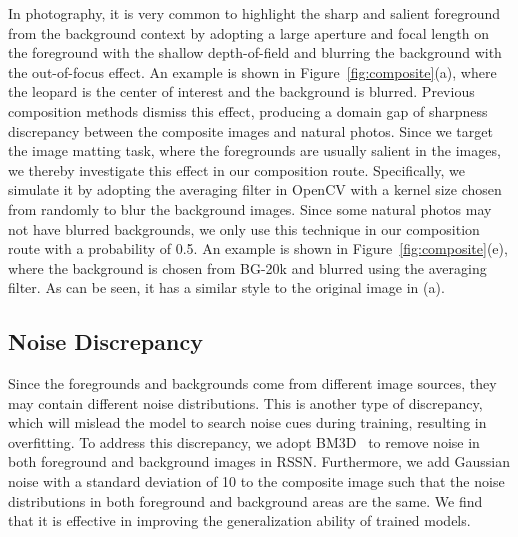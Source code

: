 \documentclass[twocolumn]{svjour3}
\begin{document}
In photography, it is very common to highlight the sharp and salient foreground from the background context by adopting a large aperture and focal length on the foreground with the shallow depth-of-field and blurring the background with the out-of-focus effect. An example is shown in Figure~\ref{fig:composite}(a), where the leopard is the center of interest and the background is blurred. Previous composition methods dismiss this effect, producing a domain gap of sharpness discrepancy between the composite images and natural photos. Since we target the image matting task, where the foregrounds are usually salient in the images, we thereby investigate this effect in our composition route. Specifically, we simulate it by adopting the averaging filter in OpenCV with a kernel size chosen from  randomly to blur the background images. Since some natural photos may not have blurred backgrounds, we only use this technique in our composition route with a probability of 0.5. An example is shown in Figure~\ref{fig:composite}(e), where the background is chosen from BG-20k and blurred using the averaging filter. As can be seen, it has a similar style to the original image in (a).

\subsection{Noise Discrepancy}

Since the foregrounds and backgrounds come from different image sources, they may contain different noise distributions. This is another type of discrepancy, which will mislead the model to search noise cues during training, resulting in overfitting. To address this discrepancy, we adopt BM3D~\citep{dabov2009bm3d} to remove noise in both foreground and background images in RSSN. Furthermore, we add Gaussian noise with a standard deviation of 10 to the composite image such that the noise distributions in both foreground and background areas are the same. We find that it is effective in improving the generalization ability of trained models.
\end{document}
